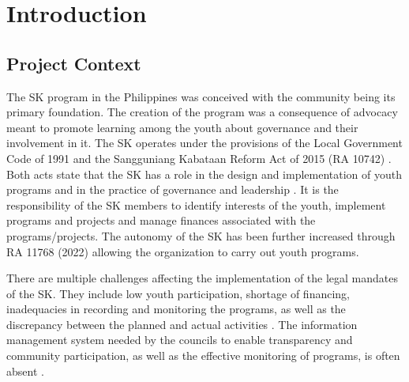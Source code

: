 \chapter{Introduction}
\label{chap:introduction}

\section{Project Context}
\label{sec:project_context}

\hspace*{\parindent}The SK program in the Philippines was conceived with the community being its primary foundation. The creation of the program was a consequence of advocacy meant to promote learning among the youth about governance and their involvement in it. The SK operates under the provisions of the Local Government Code of 1991 and the Sangguniang Kabataan Reform Act of 2015 (RA 10742) \cite{AU}. Both acts state that the SK has a role in the design and implementation of youth programs and in the practice of governance and leadership \cite{AU, AV}. It is the responsibility of the SK members to identify interests of the youth, implement programs and projects and manage finances associated with the programs/projects. The autonomy of the SK has been further increased through RA 11768 (2022) \cite{AV} allowing the organization to carry out youth programs.

\vspace{3mm}
\hspace*{\parindent}There are multiple challenges affecting the implementation of the legal mandates of the SK. They include low youth participation, shortage of financing, inadequacies in recording and monitoring the programs, as well as the discrepancy between the planned and actual activities \cite{I, J, K, AB, AR}. The information management system needed by the councils to enable transparency and community participation, as well as the effective monitoring of programs, is often absent \cite{J, K, AB}.


